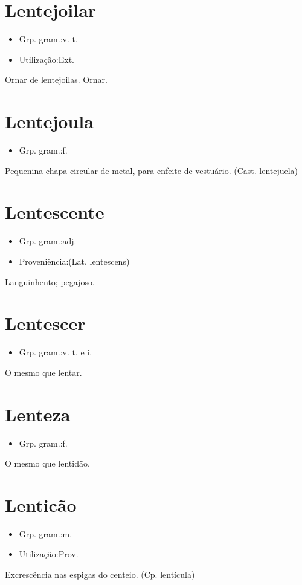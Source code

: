 \section{Lentejoilar}
\begin{itemize}
\item {Grp. gram.:v. t.}
\end{itemize}
\begin{itemize}
\item {Utilização:Ext.}
\end{itemize}
Ornar de lentejoilas.
Ornar.
\section{Lentejoula}
\begin{itemize}
\item {Grp. gram.:f.}
\end{itemize}
Pequenina chapa circular de metal, para enfeite de vestuário.
(Cast. \textunderscore lentejuela\textunderscore )
\section{Lentescente}
\begin{itemize}
\item {Grp. gram.:adj.}
\end{itemize}
\begin{itemize}
\item {Proveniência:(Lat. \textunderscore lentescens\textunderscore )}
\end{itemize}
Languinhento; pegajoso.
\section{Lentescer}
\begin{itemize}
\item {Grp. gram.:v. t.  e  i.}
\end{itemize}
O mesmo que \textunderscore lentar\textunderscore .
\section{Lenteza}
\begin{itemize}
\item {Grp. gram.:f.}
\end{itemize}
O mesmo que \textunderscore lentidão\textunderscore .
\section{Lenticão}
\begin{itemize}
\item {Grp. gram.:m.}
\end{itemize}
\begin{itemize}
\item {Utilização:Prov.}
\end{itemize}
Excrescência nas espigas do centeio.
(Cp. \textunderscore lentícula\textunderscore )
